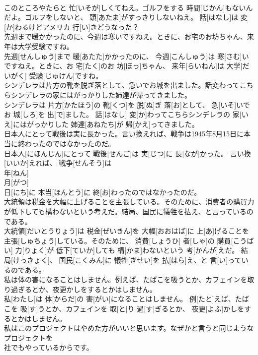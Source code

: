 \documentclass[8pt]{extreport}
\begin{document}
\begin{CJK}{UTF8}{min}
\\	このところやたらと 忙[いそが]しくてねえ。ゴルフをする 時間[じかん]もないんだよ。ゴルフをしないと、 頭[あたま]がすっきりしないねえ。 話[はなし]は 変[か]わるけどアメリカ 行[い]きどうなった？
\\	先週まで暖かかったのに、今週は寒いですねえ。ときに、お宅のお坊ちゃん、来年は大学受験ですね。	
\\	先週[せんしゅう]まで 暖[あたた]かかったのに、 今週[こんしゅう]は 寒[さむ]いですねえ。ときに、お 宅[たく]のお 坊[ぼっ]ちゃん、 来年[らいねん]は 大学[だいがく] 受験[じゅけん]ですね。
\\	シンデレラは片方の靴を脱ぎ落として、急いでお城を出ました。話変わってこちらシンデレラの家にはがっかりした姉達が帰ってきました。	
\\	シンデレラは 片方[かたほう]の 靴[くつ]を 脱[ぬ]ぎ 落[お]として、 急[いそ]いでお 城[しろ]を 出[で]ました。 話[はなし] 変[か]わってこちらシンデレラの 家[いえ]にはがっかりした 姉達[あねたち]が 帰[かえ]ってきました。
\\	日本人にとって戦後は実に長かった。言い換えれば、戦争は1945年8月15日に本当に終わったのではなかったのだ。	
\\	日本人[にほんじん]にとって 戦後[せんご]は 実[じつ]に 長[なが]かった。 言い換[いいか]えれば、 戦争[せんそう]は 
\\	年[ねん] 
\\	月[がつ] 
\\	日[にち]に 本当[ほんとう]に 終[お]わったのではなかったのだ。
\\	大統領は税金を大幅に上げることを主張している。そのために、消費者の購買力が低下しても構わないという考えだ。結局、国民に犠牲を払え、と言っているのである。	
\\	大統領[だいとうりょう]は 税金[ぜいきん]を 大幅[おおはば]に 上[あ]げることを 主張[しゅちょう]している。そのために、 消費[しょうひ] 者[しゃ]の 購買[こうばい] 力[りょく]が 低下[ていか]しても 構[かま]わないという 考[かんが]えだ。 結局[けっきょく]、 国民[こくみん]に 犠牲[ぎせい]を 払[はら]え、と 言[い]っているのである。
\\	私は体の害になることはしません。例えば、たばこを吸うとか、カフェインを取り過ぎるとか、夜更かしをするとかはしません。	
\\	私[わたし]は 体[からだ]の 害[がい]になることはしません。 例[たと]えば、たばこを 吸[す]うとか、カフェインを 取[と]り 過[す]ぎるとか、 夜更[よふ]かしをするとかはしません。
\\	私はこのプロジェクトはやめた方がいいと思います。なぜかと言うと同じようなプロジェクトを
\\	社でもやっているからです。	

\end{CJK}
\end{document}
